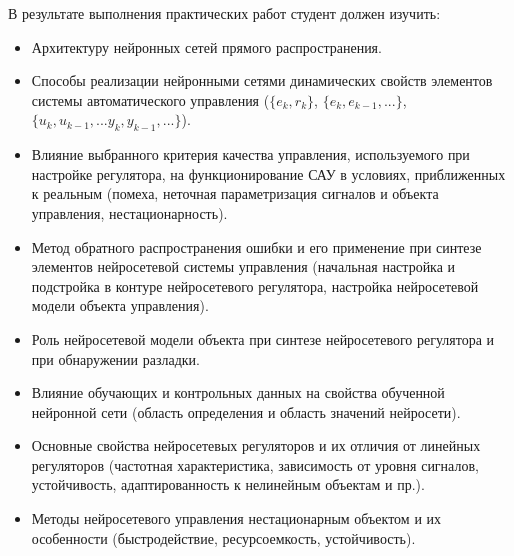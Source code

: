 В результате выполнения практических работ студент должен изучить:
\begin{itemize}

\item Архитектуру нейронных сетей прямого распространения.

\item Способы реализации нейронными сетями динамических свойств
  элементов системы автоматического управления ($\{{e_k,r_k}\}$,
  $\{e_k,e_{k-1},...\}$, $\{u_k,u_{k-1},...y_k,y_{k-1},...\}$).

\item Влияние выбранного критерия качества управления, используемого
  при настройке регулятора, на функционирование САУ в условиях,
  приближенных к реальным (помеха, неточная параметризация сигналов и
  объекта управления, нестационарность).

\item Метод обратного распространения ошибки и его применение при
  синтезе элементов нейросетевой системы управления (начальная
  настройка и подстройка в контуре нейросетевого регулятора, настройка
  нейросетевой модели объекта управления).

\item Роль нейросетевой модели объекта при синтезе нейросетевого
  регулятора и при обнаружении разладки.

\item Влияние обучающих и контрольных данных на свойства обученной
  нейронной сети (область определения и область значений нейросети).

\item Основные свойства нейросетевых регуляторов и их отличия от
  линейных регуляторов (частотная характеристика, зависимость от
  уровня сигналов, устойчивость, адаптированность к нелинейным
  объектам и пр.).

\item Методы нейросетевого управления нестационарным объектом и их
  особенности (быстродействие, ресурсоемкость, устойчивость).

\end{itemize}
